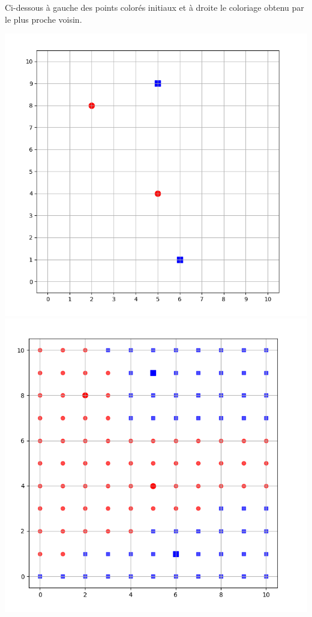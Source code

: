 \documentclass[11pt,class=report,crop=false]{standalone}
\begin{document}
\begin{activite}
\begin{enumerate}
	Ci-dessous à gauche des points colorés initiaux et à droite le coloriage obtenu par le plus proche voisin. 
	\begin{center}
	\includegraphics[scale=\myscale,scale=0.25]{ecran-voisins-4} \quad
	\includegraphics[scale=\myscale,scale=0.25]{ecran-voisins-5}
	\end{center}


\end{enumerate}
\end{activite}
\end{document}
